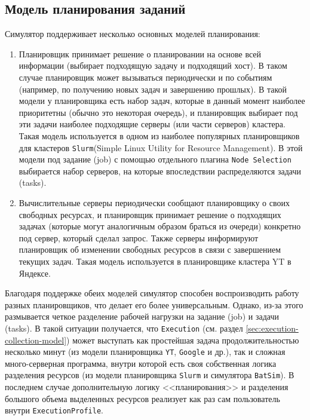 \subsection{Модель планирования заданий}

Симулятор поддерживает несколько основных моделей планирования: 
\begin{enumerate}
    \item Планировщик принимает решение о планировании на основе всей информации (выбирает подходящую задачу и подходящий хост). В таком случае планировщик может вызываться периодически и по событиям (например, по получению новых задач и завершению прошлых). В такой модели у планировщика есть набор задач, которые в данный момент наиболее приоритетны (обычно это некоторая очередь), и планировщик выбирает под эти задачи наиболее подходящие серверы (или части серверов) кластера. Такая модель используется в одном из наиболее популярных планировщиков для кластеров \texttt{Slurm}(Simple Linux Utility for Resource Management)\cite{slurm-cpu-management}. В этой модели под задание (job) с помощью отдельного плагина \texttt{Node Selection} выбирается набор серверов, на которые впоследствии распределяются задачи (tasks). 
    \item Вычислительные серверы периодически сообщают планировщику о своих свободных ресурсах, и планировщик принимает решение о подходящих задачах (которые могут аналогичным образом браться из очереди) конкретно под сервер, который сделал запрос. Также серверы информируют планировщик об изменении свободных ресурсов в связи с завершением текущих задач. Такая модель используется в планировщике кластера YT в Яндексе\cite{yt-scheduler}.
\end{enumerate}

Благодаря поддержке обеих моделей симулятор способен воспроизводить работу разных планировщиков, что делает его более универсальным. Однако, из-за этого размывается четкое разделение рабочей нагрузки на задание (job) и задачи (tasks). В такой ситуации получается, что \texttt{Execution} (см. раздел \ref{sec:execution-collection-model}) может выступать как простейшая задача продолжительностью несколько минут (из модели планировщика \texttt{YT}, \texttt{Google} и др.), так и сложная много-серверная программа, внутри которой есть своя собственная логика разделения ресурсов (из модели планировщика \texttt{Slurm} и симулятора \texttt{BatSim}). В последнем случае дополнительную логику <<планирования>> и разделения большого объема выделенных ресурсов реализует как раз сам пользователь внутри \texttt{ExecutionProfile}.


